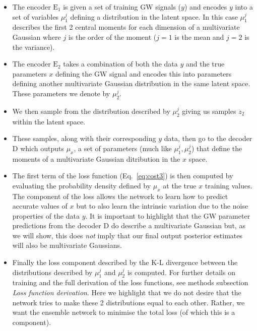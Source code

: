 \documentclass[%
showpacs,
 amsmath,amssymb,
 aps,
 twocolumn,
 prl,
 reprint,
floatfix,
]{revtex4-1}
\begin{document}
\begin{itemize}
%
\item The encoder $\textrm{E}_1$ is given a set of training \ac{GW} signals
($y$) and encodes $y$ into a set of variables $\mu^{j}_{1}$ defining a
distribution in the latent space. In this case $\mu^{j}_{1}$ describes the
first 2 central moments for each dimension of a multivariate Gaussian where $j$
is the order of the moment ($j=1$ is the mean and $j=2$ is the variance). 
%
\item The encoder $\textrm{E}_2$ takes a combination of both the data $y$ and
the true parameters $x$ defining the \ac{GW} signal and encodes this into
parameters defining another multivariate Gaussian distribution in the same
latent space. These parameters we denote by $\mu^{j}_{2}$.
%
\item We then sample from the distribution described by $\mu^{j}_{2}$
giving us samples $z_{2}$ within the latent space. 
%
\item These samples, along with their corresponding $y$ data, then go to the
decoder D which outputs $\mu_{x}$, a set of parameters (much like
$\mu^{j}_{1},\mu^{j}_{2}$) that define the moments of a multivariate Gaussian
ditribution in the $x$ space.
\item The first term of the loss function (Eq.~\ref{eq:cost3}) is then computed
by evaluating the probability density defined by $\mu_x$ at the true $x$
training values. The component of the loss allows the network to learn how to
predict accurate values of $x$ but to also learn the intrinsic variation due to
the noise properties of the data $y$. It is important to highlight that the
\ac{GW} parameter predictions from the decoder D do describe a multivariate
Gaussian but, as we will show, this does \emph{not} imply that our final output
posterior estimates will also be multivariate Gaussians.
%
\item Finally the loss component described by the K-L divergence between the
distributions described by $\mu^{j}_1$ and $\mu^{j}_2$ is computed. For further
details on training and the full derivation of the loss functions, see methods
subsection \textit{Loss function derivation}. Here we highlight that we do not
desire that the network tries to make these 2 distributions equal to each
other. Rather, we want the ensemble network to minimise the total loss (of
which this is a component).  
%
\end{itemize}
\end{document}
